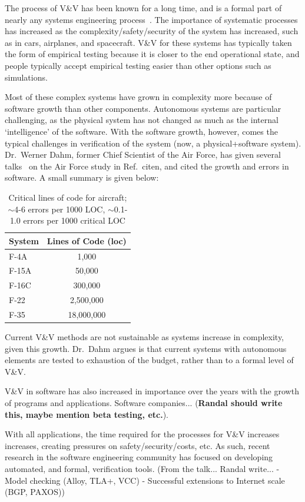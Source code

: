 The process of V\&V has been known for a long time, and is a formal part of nearly any systems engineering process~\cite{syseng-book}. The importance  of systematic processes has increased as the complexity/safety/security of the system has increased, such as in cars, airplanes, and spacecraft. V\&V for these systems has typically taken the form of empirical testing because it is closer to the end operational state, and people typically accept empirical testing easier than other options such as simulations. 

Most of these complex systems have grown in complexity more because of software growth than other components. Autonomous systems are particular challenging, as the physical system has not changed as much as the internal `intelligence' of the software. With the software growth, however, comes the typical challenges in verification of the system (now, a physical+software system). Dr.\ Werner Dahm, former Chief Scientist of the Air Force, has given several talks~\cite{gnc-talk} on the Air Force study in Ref.~citen{}, and cited the growth and errors in software. A small summary is given below:

\begin{table}
\begin{center}
\begin{tabular}{l|c}
System &  Lines of Code (loc)\\ \hline
F-4A & 1,000\\
F-15A &  50,000\\
F-16C &  300,000\\
F-22 &  2,500,000\\
F-35 &  18,000,000
\end{tabular}
\caption{Critical lines of code for aircraft; $\sim$4-6 errors per 1000 LOC, $\sim$0.1-1.0 errors per 1000 critical LOC}
   \label{table:loc}
\end{center}
\end{table}

Current V\&V methods are not sustainable as systems increase in complexity, given this growth. Dr.\ Dahm argues is that current systems with autonomous elements are tested to exhaustion of the budget, rather than to a formal level of V\&V. 

V\&V in software has also increased in importance over the years with the growth of programs and applications. Software companies... ({\bf Randal should write this, maybe mention beta testing, etc.}). 

With all applications, the time required for the processes for V\&V increases increases, creating pressures on safety/security/costs, etc. As such, recent research in the software engineering community has focused on developing automated, and formal, verification tools. (From the talk... Randal write...
- Model checking (Alloy, TLA+, VCC)
- Successful extensions to Internet scale (BGP, PAXOS))

